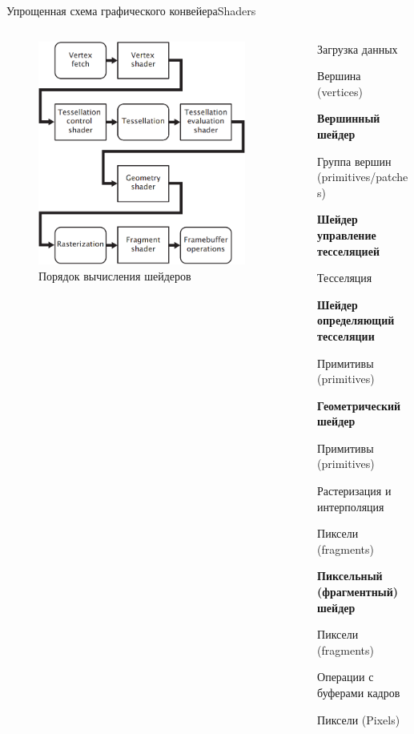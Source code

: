 \documentclass{beamer}
\begin{document}
\begin{frame}{Упрощенная схема графического конвейера}{Shaders}
	\begin{columns}
		\begin{column}{0.5\textwidth}
			\begin{figure}
				\includegraphics[width=0.9\textwidth]{images/Simplified_model_of_the_graphics_pipeline.png}
				\caption {Порядок вычисления шейдеров}
			\end{figure}
		\end{column}
		\begin{column}{0.5\textwidth}

			{\footnotesize

			Загрузка данных

			{\hfill Вершина (vertices)}

			\textbf{Вершинный шейдер}

			{\hfill Группа вершин (primitives/patches)}

			\textbf{Шейдер управление тесселяцией}

			Тесселяция

			\textbf{Шейдер определяющий тесселяции}

			{\hfill Примитивы (primitives)}

			\textbf{Геометрический шейдер}

			{\hfill Примитивы (primitives)}

			Растеризация и интерполяция

			{\hfill Пиксели (fragments)}

			\textbf{Пиксельный (фрагментный) шейдер}

			{\hfill Пиксели (fragments)}

			Операции с буферами кадров

			{\hfill Пиксели (Pixels)}
			}
		\end{column}
	\end{columns}


\end{frame}
\end{document}
